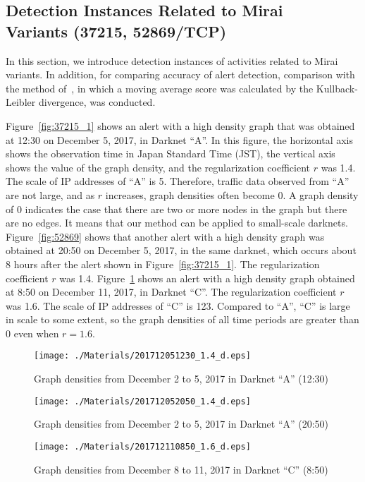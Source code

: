 \documentclass[letterpaper]{sig-alternate-10pt}
\begin{document}
\subsection{Detection Instances Related to Mirai \\Variants (37215, 52869/TCP)}
In this section, we introduce detection instances of activities related to Mirai variants.
In addition, for comparing accuracy of alert detection, comparison with the method of~\cite{Mukai1}, in which a moving average score was calculated by the Kullback-Leibler divergence, was conducted.

Figure~\ref{fig:37215_1} shows an alert with a high density graph that was obtained at 12:30 on December 5, 2017, in Darknet ``A''.
In this figure, the horizontal axis shows the observation time in Japan Standard Time (JST), the vertical axis shows the value of the graph density, and the regularization coefficient $r$ was 1.4.
The scale of IP addresses of ``A'' is 5.
Therefore, traffic data observed from ``A'' are not large, and as $r$ increases, graph densities often become 0.
A graph density of 0 indicates the case that there are two or more nodes in the graph but there are no edges.
It means that our method can be applied to small-scale darknets.
Figure~\ref{fig:52869} shows that another alert with a high density graph was obtained at 20:50 on December 5, 2017, in the same darknet, which occurs about 8 hours after the alert shown in Figure~\ref{fig:37215_1}.
The regularization coefficient $r$ was 1.4.
Figure~\ref{fig:37215_2} shows an alert with a high density graph obtained at 8:50 on December 11, 2017, in Darknet ``C''.
The regularization coefficient $r$ was 1.6.
The scale of IP addresses of ``C'' is 123.
Compared to ``A'', ``C'' is large in scale to some extent, so the graph densities of all time periods are greater than 0 even when $r = 1.6$.

\begin{figure}[htb]
\begin{center}
	\texttt{[image: ./Materials/201712051230\_1.4\_d.eps]}
	\caption{Graph densities from December 2 to 5, 2017 in Darknet ``A'' (12:30)}
  	\label{fig:37215_1}
	\vspace*{0.5cm}
	\texttt{[image: ./Materials/201712052050\_1.4\_d.eps]}
	\caption{Graph densities from December 2 to 5, 2017 in Darknet ``A'' (20:50)}
  	\label{fig:52869}
	\vspace*{0.5cm}
	\texttt{[image: ./Materials/201712110850\_1.6\_d.eps]}
	\caption{Graph densities from December 8 to 11, 2017 in Darknet ``C'' (8:50)}
  	\label{fig:37215_2}
\end{center}
\end{figure}
\end{document}
